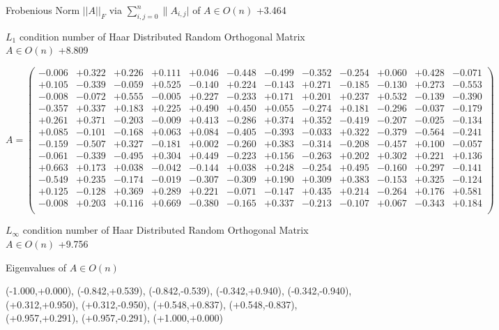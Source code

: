 \documentclass[9pt]{article}
\theoremstyle{plain}
\theoremstyle{definition}
\theoremstyle{remark}
\numberwithin{equation}{section}
\begin{document}
Frobenious Norm  $||A||_{\textit{F}}$ via $\sum\limits_{i,j =0}^{n} \|A_{i,j}|$   of  $A \in O(n)$  +3.464

$L_1$ condition number of Haar Distributed Random Orthogonal Matrix $A \in O(n)$ +8.809

$A = \left(
\begin{array}{
cccccccccccc}
-0.006 & +0.322 & +0.226 & +0.111 & +0.046 & -0.448 & -0.499 & -0.352 & -0.254 & +0.060 & +0.428 & -0.071 \\
+0.105 & -0.339 & -0.059 & +0.525 & -0.140 & +0.224 & -0.143 & +0.271 & -0.185 & -0.130 & +0.273 & -0.553 \\
-0.008 & -0.072 & +0.555 & -0.005 & +0.227 & -0.233 & +0.171 & +0.201 & +0.237 & +0.532 & -0.139 & -0.390 \\
-0.357 & +0.337 & +0.183 & +0.225 & +0.490 & +0.450 & +0.055 & -0.274 & +0.181 & -0.296 & -0.037 & -0.179 \\
+0.261 & +0.371 & -0.203 & -0.009 & +0.413 & -0.286 & +0.374 & +0.352 & -0.419 & -0.207 & -0.025 & -0.134 \\
+0.085 & -0.101 & -0.168 & +0.063 & +0.084 & -0.405 & -0.393 & -0.033 & +0.322 & -0.379 & -0.564 & -0.241 \\
-0.159 & -0.507 & +0.327 & -0.181 & +0.002 & -0.260 & +0.383 & -0.314 & -0.208 & -0.457 & +0.100 & -0.057 \\
-0.061 & -0.339 & -0.495 & +0.304 & +0.449 & -0.223 & +0.156 & -0.263 & +0.202 & +0.302 & +0.221 & +0.136 \\
+0.663 & +0.173 & +0.038 & -0.042 & -0.144 & +0.038 & +0.248 & -0.254 & +0.495 & -0.160 & +0.297 & -0.141 \\
-0.549 & +0.235 & -0.174 & -0.019 & -0.307 & -0.309 & +0.190 & +0.309 & +0.383 & -0.153 & +0.325 & -0.124 \\
+0.125 & -0.128 & +0.369 & +0.289 & +0.221 & -0.071 & -0.147 & +0.435 & +0.214 & -0.264 & +0.176 & +0.581 \\
-0.008 & +0.203 & +0.116 & +0.669 & -0.380 & -0.165 & +0.337 & -0.213 & -0.107 & +0.067 & -0.343 & +0.184 \\
\end{array}
\right)$ \newline 

$L_{\infty}$ condition number of Haar Distributed Random Orthogonal Matrix $A \in O(n)$ +9.756

Eigenvalues of $A \in O(n)$

(-1.000,+0.000), (-0.842,+0.539), (-0.842,-0.539), (-0.342,+0.940), (-0.342,-0.940), (+0.312,+0.950), (+0.312,-0.950), (+0.548,+0.837), (+0.548,-0.837), (+0.957,+0.291), (+0.957,-0.291), (+1.000,+0.000)
\end{document}
